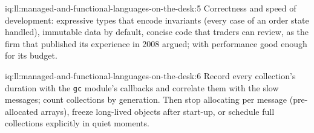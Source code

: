 \begin{solution}{iq:ll:managed-and-functional-languages-on-the-desk:5}
Correctness and speed of development: expressive types that encode invariants (every case of an order state handled), immutable
data by default, concise code that traders can review, as the firm that published its experience in 2008 argued; with
performance good enough for its budget.
\end{solution}

\begin{solution}{iq:ll:managed-and-functional-languages-on-the-desk:6}
Record every collection's duration with the \texttt{gc} module's callbacks and correlate them with the slow messages; count
collections by generation. Then stop allocating per message (pre-allocated arrays), freeze long-lived objects after start-up,
or schedule full collections explicitly in quiet moments.
\end{solution}
